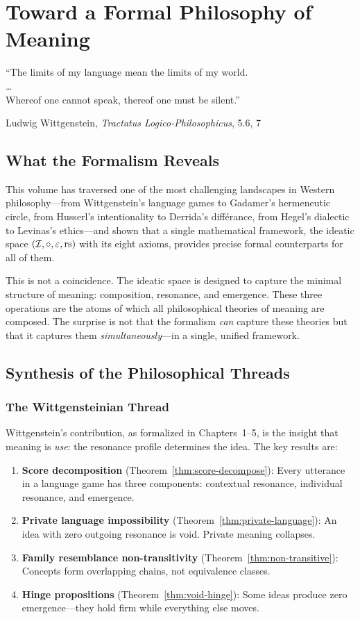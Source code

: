 \chapter{Toward a Formal Philosophy of Meaning}
\label{ch:synthesis}

\epigraph{``The limits of my language mean the limits of my world.\\
\ldots\\
Whereof one cannot speak, thereof one must be silent.''}{Ludwig Wittgenstein, \textit{Tractatus Logico-Philosophicus}, 5.6, 7}

\section{What the Formalism Reveals}

This volume has traversed one of the most challenging landscapes in Western
philosophy---from Wittgenstein's language games to Gadamer's hermeneutic circle,
from Husserl's intentionality to Derrida's diff\'erance, from Hegel's dialectic
to Levinas's ethics---and shown that a single mathematical framework, the
ideatic space $(\mathcal{I}, \circ, \varepsilon, \mathrm{rs})$ with its eight axioms, provides
precise formal counterparts for all of them.

This is not a coincidence. The ideatic space is designed to capture the minimal
structure of meaning: composition, resonance, and emergence. These three
operations are the atoms of which all philosophical theories of meaning are
composed. The surprise is not that the formalism \emph{can} capture these
theories but that it captures them \emph{simultaneously}---in a single, unified
framework.

\section{Synthesis of the Philosophical Threads}

\subsection{The Wittgensteinian Thread}

Wittgenstein's contribution, as formalized in Chapters~1--5, is the insight that
meaning is \emph{use}: the resonance profile determines the idea. The key
results are:
\begin{enumerate}
\item \textbf{Score decomposition} (Theorem~\ref{thm:score-decompose}): Every
utterance in a language game has three components: contextual resonance,
individual resonance, and emergence.
\item \textbf{Private language impossibility} (Theorem~\ref{thm:private-language}):
An idea with zero outgoing resonance is void. Private meaning collapses.
\item \textbf{Family resemblance non-transitivity} (Theorem~\ref{thm:non-transitive}):
Concepts form overlapping chains, not equivalence classes.
\item \textbf{Hinge propositions} (Theorem~\ref{thm:void-hinge}): Some ideas
produce zero emergence---they hold firm while everything else moves.
\end{enumerate}

